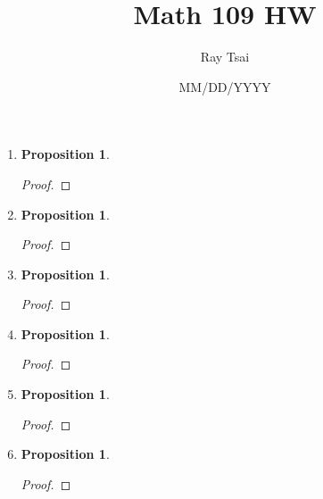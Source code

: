 \documentclass{article}
\title{Math 109 HW}
\author{Ray Tsai}
\date{MM/DD/YYYY}
\newtheorem{prop}[thm]{Proposition}
\begin{document}
 

\maketitle 

\begin{enumerate}
\item 
\begin{prop}
    
\end{prop}
\begin{proof}

\end{proof}

\item 
\begin{prop}

\end{prop}
\begin{proof}

\end{proof}

\item \begin{prop}

\end{prop}
\begin{proof}

\end{proof}

\item 
\begin{prop}
     
\end{prop}
\begin{proof}
    
\end{proof}

\item 
\begin{prop}
   
\end{prop}
\begin{proof}

\end{proof}

\item 
\begin{prop}
    
\end{prop}
\begin{proof}


\end{proof}
\end{enumerate}
\end{document}
